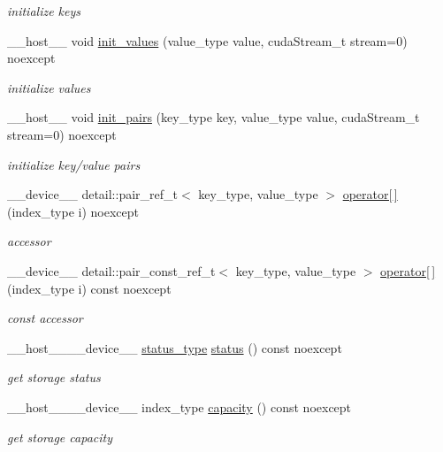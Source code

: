 \begin{DoxyCompactItemize}
\begin{DoxyCompactList}\small\item\em initialize keys \end{DoxyCompactList}\item 
\+\_\+\+\_\+host\+\_\+\+\_\+ void \hyperlink{classwarpcore_1_1storage_1_1key__value_1_1SoAStore_af436501d6e623ed9196e5e1f1f55f689}{init\+\_\+values} (value\+\_\+type value, cuda\+Stream\+\_\+t stream=0) noexcept
\begin{DoxyCompactList}\small\item\em initialize values \end{DoxyCompactList}\item 
\+\_\+\+\_\+host\+\_\+\+\_\+ void \hyperlink{classwarpcore_1_1storage_1_1key__value_1_1SoAStore_a1b41f73f6fb6df50a7262466f05e5c02}{init\+\_\+pairs} (key\+\_\+type key, value\+\_\+type value, cuda\+Stream\+\_\+t stream=0) noexcept
\begin{DoxyCompactList}\small\item\em initialize key/value pairs \end{DoxyCompactList}\item 
\+\_\+\+\_\+device\+\_\+\+\_\+ detail\+::pair\+\_\+ref\+\_\+t$<$ key\+\_\+type, value\+\_\+type $>$ \hyperlink{classwarpcore_1_1storage_1_1key__value_1_1SoAStore_a0ffce52b3ad4d09f6709f3731c79fb3e}{operator\mbox{[}$\,$\mbox{]}} (index\+\_\+type i) noexcept
\begin{DoxyCompactList}\small\item\em accessor \end{DoxyCompactList}\item 
\+\_\+\+\_\+device\+\_\+\+\_\+ detail\+::pair\+\_\+const\+\_\+ref\+\_\+t$<$ key\+\_\+type, value\+\_\+type $>$ \hyperlink{classwarpcore_1_1storage_1_1key__value_1_1SoAStore_a0ffbe21819280b32a78ad98dd8a7dd43}{operator\mbox{[}$\,$\mbox{]}} (index\+\_\+type i) const noexcept
\begin{DoxyCompactList}\small\item\em const accessor \end{DoxyCompactList}\item 
\+\_\+\+\_\+host\+\_\+\+\_\+\+\_\+\+\_\+device\+\_\+\+\_\+ \hyperlink{classwarpcore_1_1Status}{status\+\_\+type} \hyperlink{classwarpcore_1_1storage_1_1key__value_1_1SoAStore_afe3a33107f19d895ed0aa78bfedd2de0}{status} () const noexcept
\begin{DoxyCompactList}\small\item\em get storage status \end{DoxyCompactList}\item 
\+\_\+\+\_\+host\+\_\+\+\_\+\+\_\+\+\_\+device\+\_\+\+\_\+ index\+\_\+type \hyperlink{classwarpcore_1_1storage_1_1key__value_1_1SoAStore_a2ae1c90988d891741861e6e6d571ec00}{capacity} () const noexcept
\begin{DoxyCompactList}\small\item\em get storage capacity \end{DoxyCompactList}\end{DoxyCompactItemize}


